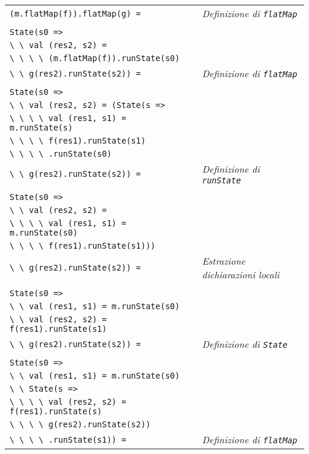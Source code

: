 \begin{tabularx}{\textwidth}{ll}
\lstinline{(m.flatMap(f)).flatMap(g) =} & \emph{Definizione di \lstinline{flatMap}}\\
\\
\lstinline{State(s0 =>} \\
\lstinline{\ \ val (res2, s2) =}\\
\lstinline{\ \ \ \ (m.flatMap(f)).runState(s0)} \\
\lstinline{\ \ g(res2).runState(s2)) =} & \emph{Definizione di \lstinline{flatMap}}\\
\\
\lstinline{State(s0 =>} \\
\lstinline{\ \ val (res2, s2) = (State(s =>} \\
\lstinline{\ \ \ \ val (res1, s1) = m.runState(s)}\\
\lstinline{\ \ \ \ f(res1).runState(s1)}\\
\lstinline{\ \ \ \ .runState(s0)} \\
\lstinline{\ \ g(res2).runState(s2)) =} & \emph{Definizione di \lstinline{runState}}\\
\\
\lstinline{State(s0 =>} \\
\lstinline{\ \ val (res2, s2) =} \\
\lstinline{\ \ \ \ val (res1, s1) = m.runState(s0)} \\
\lstinline{\ \ \ \ f(res1).runState(s1)))} \\
\lstinline{\ \ g(res2).runState(s2)) =} & \emph{Estrazione dichiarazioni locali} \\
\\
\lstinline{State(s0 =>} \\
\lstinline{\ \ val (res1, s1) = m.runState(s0)} \\
\lstinline{\ \ val (res2, s2) = f(res1).runState(s1)} \\
\lstinline{\ \ g(res2).runState(s2)) =} & \emph{Definizione di \lstinline{State}} \\
\\
\lstinline{State(s0 =>} \\
\lstinline{\ \ val (res1, s1) = m.runState(s0)} \\
\lstinline{\ \ State(s =>} \\
\lstinline{\ \ \ \ val (res2, s2) = f(res1).runState(s)} \\
\lstinline{\ \ \ \ g(res2).runState(s2))} \\
\lstinline{\ \ \ \ .runState(s1)) =} & \emph{Definizione di \lstinline{flatMap}} \\

\end{tabularx}
